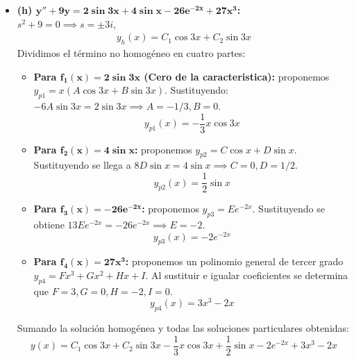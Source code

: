 \documentclass[11pt, a4paper]{article}
\begin{document}
\begin{itemize}
\item \textbf{(h) $\bm{y''+9y=2\sin 3x + 4\sin x - 26e^{-2x} + 27x^3}$:} \\
$s^2 + 9 = 0 \implies s = \pm 3i$,
\begin{align*}
y_h(x) = C_1 \cos 3x + C_2 \sin 3x
\end{align*}
Dividimos el término no homogéneo en cuatro partes:
\begin{itemize}
\item \textbf{Para $\bm{f_1(x) = 2\sin 3x}$ (Cero de la caracteristica):} proponemos $y_{p1} = x(A\cos 3x + B\sin 3x)$. Sustituyendo: $-6A\sin 3x = 2\sin 3x \implies A = -1/3, B = 0$.
\[
y_{p1}(x) = -\frac{1}{3}x\cos 3x
\]
\item \textbf{Para $\bm{f_2(x) = 4\sin x}$:} proponemos $y_{p2} = C\cos x + D\sin x$. Sustituyendo se llega a $8D\sin x = 4\sin x \implies C = 0, D = 1/2$.
\[
y_{p2}(x) = \frac{1}{2}\sin x
\]
\item \textbf{Para $\bm{f_3(x) = -26e^{-2x}}$:} proponemos $y_{p3} = Ee^{-2x}$. Sustituyendo se obtiene $13Ee^{-2x} = -26e^{-2x} \implies E = -2$.
\[
y_{p3}(x) = -2e^{-2x}
\]
\item \textbf{Para $\bm{f_4(x) = 27x^3}$:} proponemos un polinomio general de tercer grado $y_{p4} = Fx^3 + Gx^2 + Hx + I$. Al sustituir e igualar coeficientes se determina que $F=3, G=0, H=-2, I=0$.
\[
y_{p4}(x) = 3x^3 - 2x
\]
\end{itemize}
Sumando la solución homogénea y todas las soluciones particulares obtenidas:
\[
\boxed{y(x) = C_1 \cos 3x + C_2 \sin 3x - \frac{1}{3}x\cos 3x + \frac{1}{2}\sin x - 2e^{-2x} + 3x^3 - 2x}
\]
\end{itemize}
\end{document}
